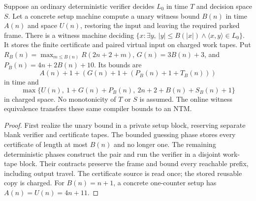 \begin{theorem}
  \label{thm:polytime-finite-verifier}
  \leanok
  Suppose an ordinary deterministic verifier decides $L_0$ in time $T$ and
  decision space $S$. Let a concrete setup machine compute a unary witness
  bound $B(n)$ in time $A(n)$ and space $U(n)$, restoring the input and leaving
  the required parked frame. There is a witness machine deciding
  $\{x : \exists y,\ |y| \le B(|x|) \land \langle x,y\rangle \in L_0\}$.
  It stores the finite certificate and paired virtual input on charged work
  tapes. Put $R_B(n)=\max_{m\le B(n)} R(2n+2+m)$, $G(n)=3B(n)+3$, and
  $P_B(n)=4n+2B(n)+10$. Its bounds are
  \[
    A(n)+1+(G(n)+1+(P_B(n)+1+T_B(n)))
  \]
  in time and
  \[
    \max\{U(n),\ 1+G(n)+P_B(n),\ 2n+2+B(n)+S_B(n)+1\}
  \]
  in charged space. No monotonicity of $T$ or $S$ is assumed. The online
  witness equivalence transfers these same compiler bounds to an NTM.
\end{theorem}
\begin{proof}
  \leanok
  First realize the unary bound in a private setup block, reserving separate
  blank verifier and certificate tapes. The bounded guessing phase stores
  every certificate of length at most $B(n)$ and no longer one. The remaining
  deterministic phases construct the pair and run the verifier in a disjoint
  work-tape block. Their contracts preserve the frame and bound every reachable
  prefix, including output travel. The certificate source is read once; the
  stored reusable copy is charged. For $B(n)=n+1$, a concrete one-counter setup
  has $A(n)=U(n)=4n+11$.
\end{proof}

